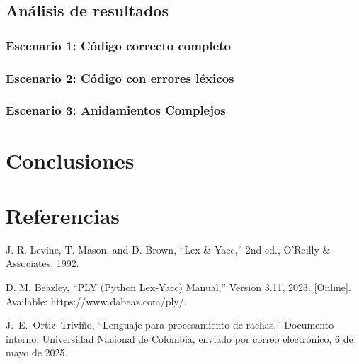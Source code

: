 \documentclass{article}
\begin{document}
\subsection{Análisis de resultados}

\subsubsection{Escenario 1: Código correcto completo}



\subsubsection{Escenario 2: Código con errores léxicos}


\subsubsection{Escenario 3:  Anidamientos Complejos }



\section{Conclusiones}


\section{Referencias}
\renewcommand{\refname}{}

\begin{thebibliography}{9}


 \label{ref:lexPy1} J. R. Levine, T. Mason, and D. 
Brown, “Lex \& Yacc,” 2nd ed., O’Reilly \& Associates, 1992.

 \label{ref:lexPy2}  D. M. Beazley, “PLY (Python Lex‐Yacc)
Manual,” Version 3.11, 2023. [Online]. Available: https://www.dabeaz.com/ply/.

 \label{ref:rachas} J.~E.~Ortiz~Triviño, ``Lenguaje para 
  procesamiento de rachas,'' Documento interno, Universidad Nacional de 
    Colombia, enviado por correo electrónico, 6 de mayo de 2025.

\end{thebibliography}
\end{document}
